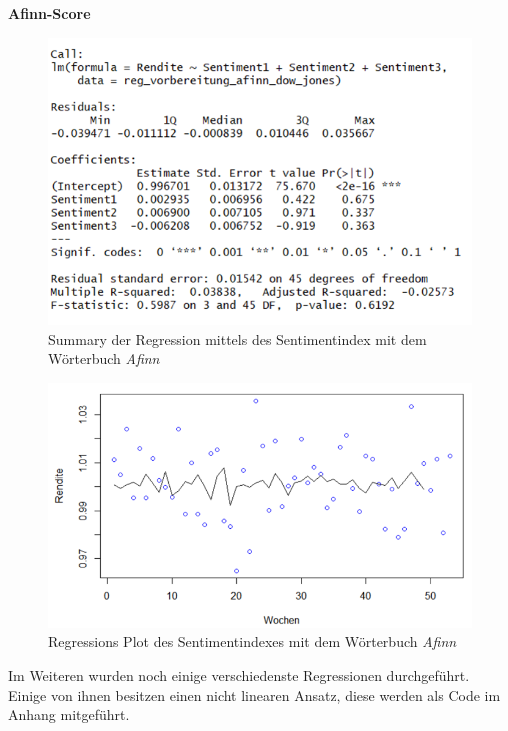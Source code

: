 \textbf{Afinn-Score}
 \begin{figure}[H]
	\centering
	\includegraphics[width=1\textwidth]{Pictures/afinn_summary.png}
	\caption{Summary der Regression mittels des Sentimentindex mit dem Wörterbuch \textit{Afinn} }
	\label{Afinn_summary}
\end{figure} 
\begin{figure}[H]
	\centering
	\includegraphics[width=1\textwidth]{Pictures/Afinn_plot.png}
	\caption{Regressions Plot des Sentimentindexes mit dem Wörterbuch \textit{Afinn} }
	\label{Afinn_plot_regression}
\end{figure} 
Im Weiteren wurden noch einige verschiedenste Regressionen durchgeführt. Einige von ihnen besitzen einen nicht linearen Ansatz, diese werden als Code im Anhang mitgeführt.  

